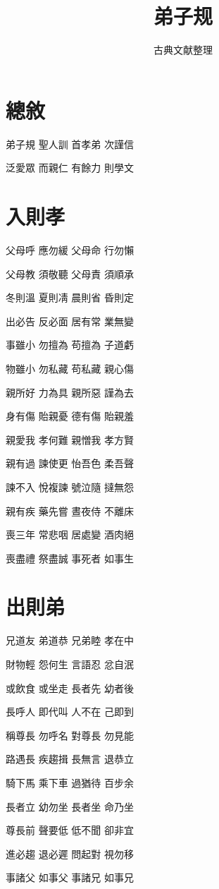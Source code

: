 \documentclass[12pt,a4paper]{ctexbook}
\title{弟子规}
\author{古典文献整理}
\date{}
\begin{document}
\maketitle
\tableofcontents
\newpage
\section{總敘}
弟子規 聖人訓 首孝弟 次謹信\par
泛愛眾 而親仁 有餘力 則學文\par

\section{入則孝}
父母呼 應勿緩 父母命 行勿懶\par
父母教 須敬聽 父母責 須順承\par
冬則溫 夏則凊 晨則省 昏則定\par
出必告 反必面 居有常 業無變\par
事雖小 勿擅為 苟擅為 子道虧\par
物雖小 勿私藏 苟私藏 親心傷\par
親所好 力為具 親所惡 謹為去\par
身有傷 貽親憂 德有傷 貽親羞\par
親愛我 孝何難 親憎我 孝方賢\par
親有過 諫使更 怡吾色 柔吾聲\par
諫不入 悅複諫 號泣隨 撻無怨\par
親有疾 藥先嘗 晝夜侍 不離床\par
喪三年 常悲咽 居處變 酒肉絕\par
喪盡禮 祭盡誠 事死者 如事生\par

\section{出則弟}
兄道友 弟道恭 兄弟睦 孝在中\par
財物輕 怨何生 言語忍 忿自泯\par
或飲食 或坐走 長者先 幼者後\par
長呼人 即代叫 人不在 己即到\par
稱尊長 勿呼名 對尊長 勿見能\par
路遇長 疾趨揖 長無言 退恭立\par
騎下馬 乘下車 過猶待 百步余\par
長者立 幼勿坐 長者坐 命乃坐\par
尊長前 聲要低 低不聞 卻非宜\par
進必趨 退必遲 問起對 視勿移\par
事諸父 如事父 事諸兄 如事兄\par
\end{document}
